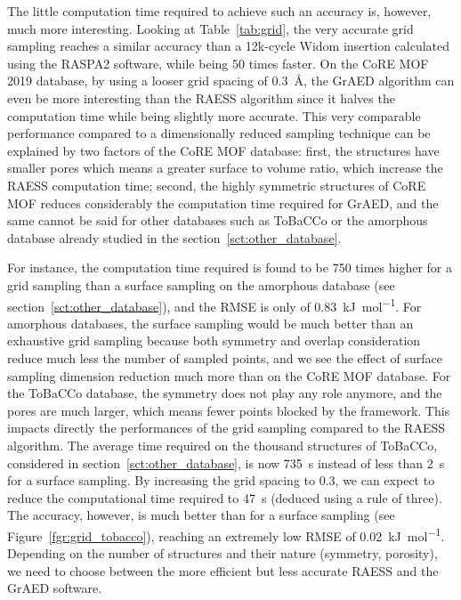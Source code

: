 \documentclass[main]{subfiles}
\begin{document}
The little computation time required to achieve such an accuracy is, however, much more interesting. Looking at Table~\ref{tab:grid}, the very accurate grid sampling reaches a similar accuracy than a 12k-cycle Widom insertion calculated using the RASPA2 software, while being 50 times faster. On the CoRE MOF 2019 database, by using a looser grid spacing of \SI{0.3}{\angstrom}, the GrAED algorithm can even be more interesting than the RAESS algorithm since it halves the computation time while being slightly more accurate. This very comparable performance compared to a dimensionally reduced sampling technique can be explained by two factors of the CoRE MOF database: first, the structures have smaller pores which means a greater surface to volume ratio, which increase the RAESS computation time; second, the highly symmetric structures of CoRE MOF reduces considerably the computation time required for GrAED, and the same cannot be said for other databases such as ToBaCCo or the amorphous database already studied in the section~\ref{sct:other_database}. 

For instance, the computation time required is found to be 750 times higher for a grid sampling than a surface sampling on the amorphous database (see section~\ref{sct:other_database}), and the RMSE is only of \SI{0.83}{\kJ\per\mol}. For amorphous databases, the surface sampling would be much better than an exhaustive grid sampling because both symmetry and overlap consideration reduce much less the number of sampled points, and we see the effect of surface sampling dimension reduction much more than on the CoRE MOF database. For the ToBaCCo database,\autocite{Colon_2017} the symmetry does not play any role anymore, and the pores are much larger, which means fewer points blocked by the framework. This impacts directly the performances of the grid sampling compared to the RAESS algorithm. The average time required on the thousand structures of ToBaCCo, considered in section~\ref{sct:other_database}, is now \SI{735}{\s} instead of less than \SI{2}{\s} for a surface sampling. By increasing the grid spacing to $0.3$, we can expect to reduce the computational time required to \SI{47}{\s} (deduced using a rule of three). The accuracy, however, is much better than for a surface sampling (see Figure~\ref{fgr:grid_tobacco}), reaching an extremely low RMSE of \SI{0.02}{\kJ\per\mol}. Depending on the number of structures and their nature (symmetry, porosity), we need to choose between the more efficient but less accurate RAESS and the GrAED software.
\end{document}
